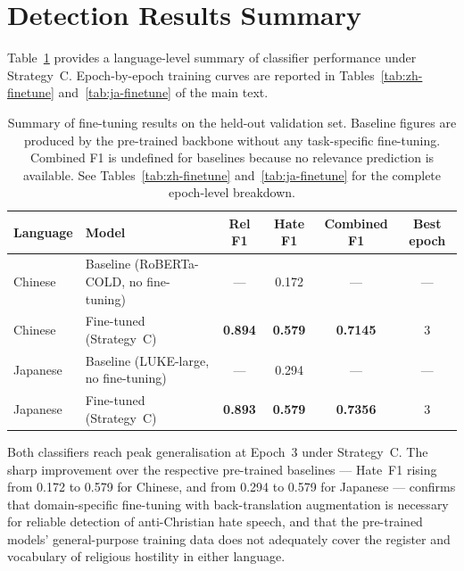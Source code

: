 \documentclass[../CLthesis.tex]{subfiles}
\begin{document}
\section{Detection Results Summary}
\label{sec:app-results}

Table~\ref{tab:finetune-summary} provides a language-level summary of classifier performance under Strategy~C. Epoch-by-epoch training curves are reported in Tables~\ref{tab:zh-finetune} and~\ref{tab:ja-finetune} of the main text.

\begin{table}[htbp]
\centering
\small
\begin{tabularx}{\textwidth}{@{} l X cccc @{}}
\toprule
Language & Model & Rel F1 & Hate F1 & Combined F1 & Best epoch \\
\midrule
Chinese  & Baseline (RoBERTa-COLD, no fine-tuning) & --- & 0.172 & --- & --- \\
Chinese  & Fine-tuned (Strategy~C) & \textbf{0.894} & \textbf{0.579} & \textbf{0.7145} & 3 \\
\midrule
Japanese & Baseline (LUKE-large, no fine-tuning) & --- & 0.294 & --- & --- \\
Japanese & Fine-tuned (Strategy~C) & \textbf{0.893} & \textbf{0.579} & \textbf{0.7356} & 3 \\
\bottomrule
\end{tabularx}
\caption{Summary of fine-tuning results on the held-out validation set. Baseline figures are produced by the pre-trained backbone without any task-specific fine-tuning. Combined F1 is undefined for baselines because no relevance prediction is available. See Tables~\ref{tab:zh-finetune} and~\ref{tab:ja-finetune} for the complete epoch-level breakdown.}
\label{tab:finetune-summary}
\end{table}

Both classifiers reach peak generalisation at Epoch~3 under Strategy~C. The sharp improvement over the respective pre-trained baselines --- Hate~F1 rising from 0.172 to 0.579 for Chinese, and from 0.294 to 0.579 for Japanese --- confirms that domain-specific fine-tuning with back-translation augmentation is necessary for reliable detection of anti-Christian hate speech, and that the pre-trained models' general-purpose training data does not adequately cover the register and vocabulary of religious hostility in either language.

\subfilebibliography
\end{document}
